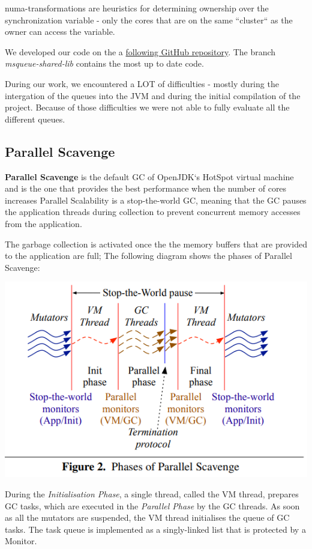 \documentclass{article}
\begin{document}
 numa-transformations are heuristics for determining ownership over the synchronization variable - only the cores that are on the same ``cluster`` as the owner can access the variable.

 We developed our code on the a \href{https://github.com/guye1296/jvm-gc-fifo/}{following GitHub repository}. The branch \textit{msqueue-shared-lib} contains the most up to date code.

 During our work, we encountered a LOT of difficulties - mostly during the intergation of the queues into the JVM and during the initial compilation of the project. Because of those difficulties we were not able to fully evaluate all the different queues.

 \newpage

 \subsection{Parallel Scavenge}
 \textbf{Parallel Scavenge} is the default GC of OpenJDK`s HotSpot virtual machine and is the one that provides the best performance when the number of cores increases\cite{paper}
 Parallel Scalability is a stop-the-world GC, meaning that the GC pauses the application threads during collection to prevent concurrent memory accesses from the application.

 The garbage collection is activated once the the memory buffers that are provided to the application are full; The following diagram shows the phases of Parallel Scavenge:

 \includegraphics[width=\textwidth]{gc_phases.png}

 During the \textit{Initialisation Phase}, a single thread, called the VM thread, prepares GC tasks, which are executed in the \textit{Parallel Phase} by the GC threads.
 As soon as all the mutators are suspended, the VM thread initialises the queue of GC tasks. The task queue is implemented as a singly-linked list that is protected by a Monitor.
\end{document}
